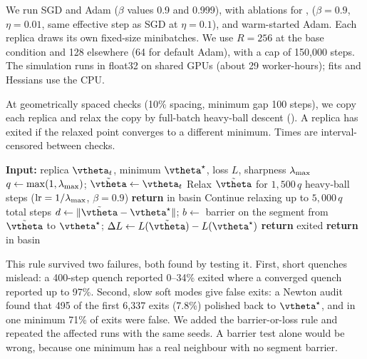 We run SGD and Adam ($\beta$ values 0.9 and 0.999), with ablations for \rmsprop, \sgdm ($\beta=0.9$, $\eta=0.01$, same effective step as SGD at $\eta=0.1$), and warm-started Adam.
Each replica draws its own fixed-size minibatches.
We use $R=256$ at the base condition and 128 elsewhere (64 for default Adam), with a cap of 150,000 steps.
The simulation runs in float32 on shared GPUs (about 29 worker-hours); fits and Hessians use the CPU.

At geometrically spaced checks (10\% spacing, minimum gap 100 steps), we copy each replica and relax the copy by full-batch heavy-ball descent ().
A replica has exited if the relaxed point converges to a different minimum.
Times are interval-censored between checks.

\begin{algorithm}[t]
\caption{Exit check for one replica}
\label{alg:quench}
\begin{algorithmic}[1]
\State \textbf{Input:} replica $\vtheta_t$, minimum $\tstar$, loss $L$, sharpness $\lambda_{\max}$
\State $q \gets \max(1,\lambda_{\max})$; \quad $\tilde\vtheta \gets \vtheta_t$ 
\State Relax $\tilde\vtheta$ for $1{,}500\,q$ heavy-ball steps ($\text{lr}=1/\lambda_{\max}$, $\beta=0.9$)
 \textbf{return} in basin 
\EndIf
\State Continue relaxing up to $5{,}000\,q$ total steps
\State $d\gets\|\tilde\vtheta-\tstar\|$; \quad $b\gets$ barrier on the segment from $\tilde\vtheta$ to $\tstar$; \quad $\Delta L\gets L(\tilde\vtheta)-L(\tstar)$
 \textbf{return} exited
\EndIf
\State \textbf{return} in basin 
\end{algorithmic}
\end{algorithm}

This rule survived two failures, both found by testing it.
First, short quenches mislead: a 400-step quench reported 0--34\% exited where a converged quench reported up to 97\%.
Second, slow soft modes give false exits: a Newton audit found that 495 of the first 6,337 exits (7.8\%) polished back to $\tstar$, and in one minimum 71\% of exits were false.
We added the barrier-or-loss rule and repeated the affected runs with the same seeds.
A barrier test alone would be wrong, because one \digitsdata minimum has a real neighbour with no segment barrier.

